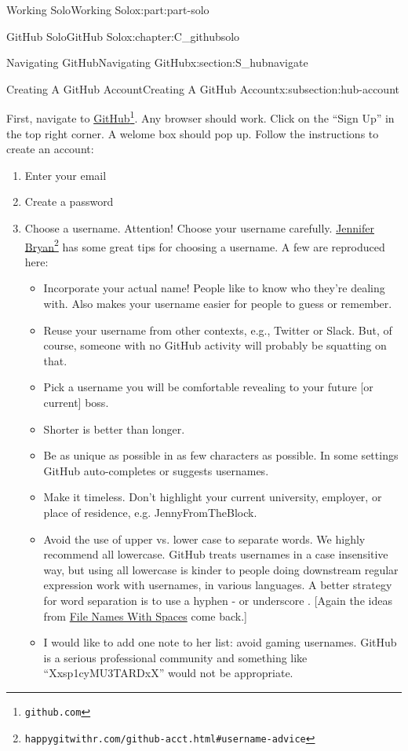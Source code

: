 \documentclass[oneside,10pt,]{book}
\begin{document}
\begin{partptx}{Working Solo}{}{Working Solo}{}{}{x:part:part-solo}
\begin{chapterptx}{GitHub Solo}{}{GitHub Solo}{}{}{x:chapter:C_githubsolo}
\begin{sectionptx}{Navigating GitHub}{}{Navigating GitHub}{}{}{x:section:S_hubnavigate}
\begin{subsectionptx}{Creating A GitHub Account}{}{Creating A GitHub Account}{}{}{x:subsection:hub-account}
\par
First, navigate to \href{https://github.com}{GitHub}\footnote{\nolinkurl{github.com}\label{g:fn:idm480365432}}. Any browser should work. Click on the ``Sign Up'' in the top right corner. A welome box should pop up. Follow the instructions to create an account:%
\begin{enumerate}
\item{}Enter your email%
\item{}Create a password%
\item{}Choose a username. Attention! Choose your username carefully. \href{https://happygitwithr.com/github-acct.html\#username-advice}{Jennifer Bryan}\footnote{\nolinkurl{happygitwithr.com/github-acct.html\#username-advice}\label{g:fn:idm480370808}} has some great tips for choosing a username. A few are reproduced here:%
\begin{itemize}[label=\textbullet]
\item{}Incorporate your actual name! People like to know who they're dealing with. Also makes your username easier for people to guess or remember.%
\item{}Reuse your username from other contexts, e.g., Twitter or Slack. But, of course, someone with no GitHub activity will probably be squatting on that.%
\item{}Pick a username you will be comfortable revealing to your future [or current] boss.%
\item{}Shorter is better than longer.%
\item{}Be as unique as possible in as few characters as possible. In some settings GitHub auto-completes or suggests usernames.%
\item{}Make it timeless. Don't highlight your current university, employer, or place of residence, e.g. JennyFromTheBlock.%
\item{}Avoid the use of upper vs. lower case to separate words. We highly recommend all lowercase. GitHub treats usernames in a case insensitive way, but using all lowercase is kinder to people doing downstream regular expression work with usernames, in various languages. A better strategy for word separation is to use a hyphen - or underscore \textunderscore{}. [Again the ideas from \hyperlink{x:paragraphs:namesspaces}{File Names With Spaces} come back.]%
\item{}I would like to add one note to her list: avoid gaming usernames. GitHub is a serious professional community and something like ``Xx\textunderscore{}sp1cyMU3TARD\textunderscore{}xX'' would not be appropriate.%

\end{itemize}
\end{enumerate}
\end{subsectionptx}
\end{sectionptx}
\end{chapterptx}
\end{partptx}
\end{document}
